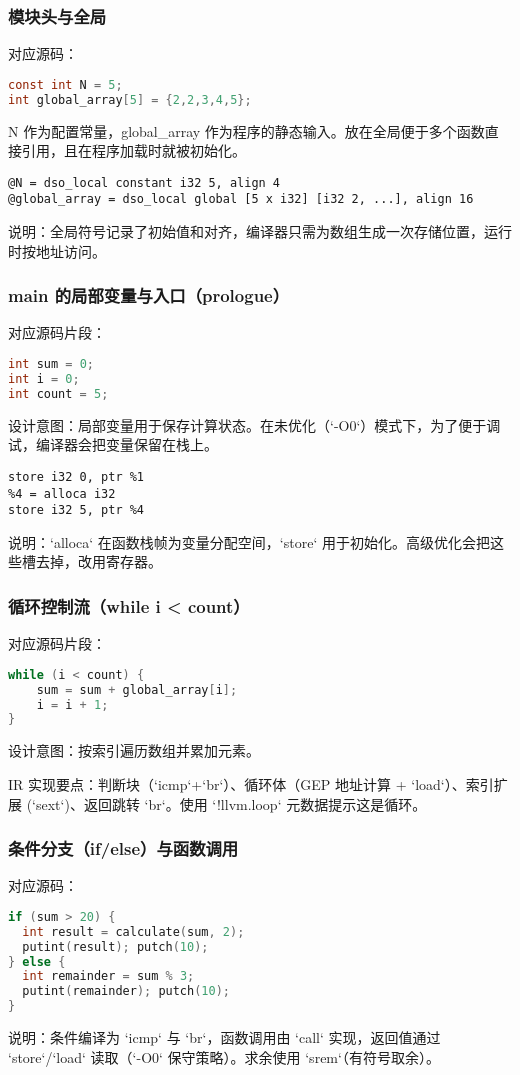 \documentclass[a4paper]{article}
\begin{document}
\subsubsection{模块头与全局}
对应源码：
\begin{lstlisting}[language=C]
const int N = 5;
int global_array[5] = {2,2,3,4,5};
\end{lstlisting}
N 作为配置常量，global\_array 作为程序的静态输入。放在全局便于多个函数直接引用，且在程序加载时就被初始化。

\begin{lstlisting}[language=text]
@N = dso_local constant i32 5, align 4
@global_array = dso_local global [5 x i32] [i32 2, ...], align 16
\end{lstlisting}
说明：全局符号记录了初始值和对齐，编译器只需为数组生成一次存储位置，运行时按地址访问。

\subsubsection{main 的局部变量与入口（prologue）}
对应源码片段：
\begin{lstlisting}[language=C]
int sum = 0;
int i = 0;
int count = 5;
\end{lstlisting}
设计意图：局部变量用于保存计算状态。在未优化（`-O0`）模式下，为了便于调试，编译器会把变量保留在栈上。

\begin{lstlisting}[language=text]
%1 = alloca i32
store i32 0, ptr %1
%4 = alloca i32
store i32 5, ptr %4
\end{lstlisting}
说明：`alloca` 在函数栈帧为变量分配空间，`store` 用于初始化。高级优化会把这些槽去掉，改用寄存器。

\subsubsection{循环控制流（while i < count）}
对应源码片段：
\begin{lstlisting}[language=C]
while (i < count) {
    sum = sum + global_array[i];
    i = i + 1;
}
\end{lstlisting}
设计意图：按索引遍历数组并累加元素。

IR 实现要点：判断块（`icmp`+`br`）、循环体（GEP 地址计算 + `load`）、索引扩展 (`sext`)、返回跳转 `br`。使用 `!llvm.loop` 元数据提示这是循环。

\subsubsection{条件分支（if/else）与函数调用}
对应源码：
\begin{lstlisting}[language=C]
if (sum > 20) {
  int result = calculate(sum, 2);
  putint(result); putch(10);
} else {
  int remainder = sum % 3;
  putint(remainder); putch(10);
}
\end{lstlisting}
说明：条件编译为 `icmp` 与 `br`，函数调用由 `call` 实现，返回值通过 `store`/`load` 读取（`-O0` 保守策略）。求余使用 `srem`（有符号取余）。
\end{document}

